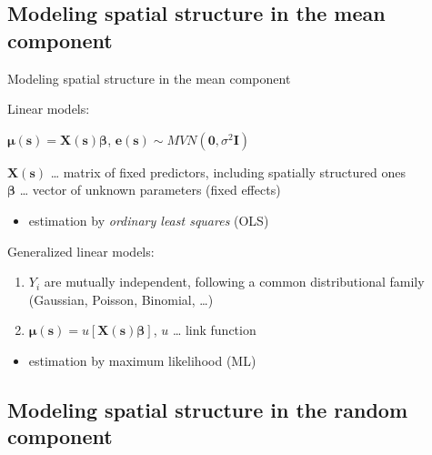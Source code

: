 \documentclass[
  ignorenonframetext,
]{beamer}
\providecommand{\tightlist}{%
  \setlength{\itemsep}{0pt}\setlength{\parskip}{0pt}}
\begin{document}
\hypertarget{modeling-spatial-structure-in-the-mean-component}{%
\subsection{Modeling spatial structure in the mean
component}\label{modeling-spatial-structure-in-the-mean-component}}

\begin{frame}{Modeling spatial structure in the mean component}
\small

Linear models:

\begin{center}
$\boldsymbol{\mu}(\boldsymbol{s}) = \boldsymbol{X}(\boldsymbol{s})\boldsymbol{\beta}$,   $\boldsymbol{e}(\boldsymbol{s}) \sim MVN(\boldsymbol{0},\sigma^2\boldsymbol{I})$
\end{center}

\(\boldsymbol{X}(\boldsymbol{s})\) \ldots{} matrix of fixed predictors,
including spatially structured ones\\
\(\boldsymbol{\beta}\) \ldots{} vector of unknown parameters (fixed
effects)

\begin{itemize}
\tightlist
\item
  estimation by \emph{ordinary least squares} (OLS)
\end{itemize}

Generalized linear models:

\begin{enumerate}
\tightlist
\item
  \(Y_i\) are mutually independent, following a common distributional
  family (Gaussian, Poisson, Binomial, \ldots)
\item
  \(\boldsymbol{\mu(\boldsymbol{s})} = u[\boldsymbol{X}(\boldsymbol{s})\boldsymbol{\beta}]\),
  \(u\) \ldots{} link function
\end{enumerate}

\begin{itemize}
\tightlist
\item
  estimation by maximum likelihood (ML)
\end{itemize}
\end{frame}

\hypertarget{modeling-spatial-structure-in-the-random-component}{%
\subsection{Modeling spatial structure in the random
component}\label{modeling-spatial-structure-in-the-random-component}}
\end{document}
